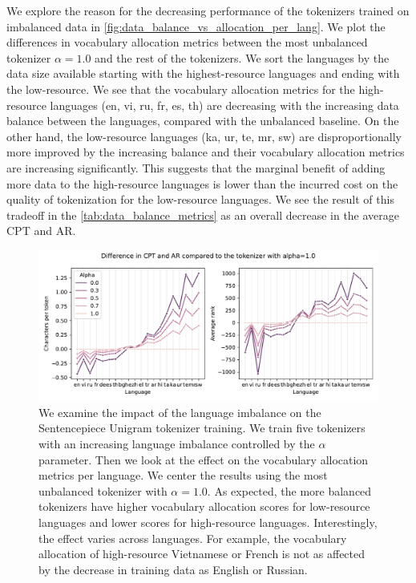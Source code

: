 We explore the reason for the decreasing performance of the tokenizers trained on imbalanced data in \autoref{fig:data_balance_vs_allocation_per_lang}. We plot the differences in vocabulary allocation metrics between the most unbalanced tokenizer $\alpha=1.0$ and the rest of the tokenizers. We sort the languages by the data size available starting with the highest-resource languages and ending with the low-resource. We see that the vocabulary allocation metrics for the high-resource languages (en, vi, ru, fr, es, th) are decreasing with the increasing data balance between the languages, compared with the unbalanced baseline. On the other hand, the low-resource languages (ka, ur, te, mr, sw) are disproportionally more improved by the increasing balance and their vocabulary allocation metrics are increasing significantly. This suggests that the marginal benefit of adding more data to the high-resource languages is lower than the incurred cost on the quality of tokenization for the low-resource languages. We see the result of this tradeoff in the \autoref{tab:data_balance_metrics} as an overall decrease in the average CPT and AR.

\begin{figure}[H]
    \centering
    \includegraphics[width=\textwidth]{figures/ar_cpt_vs_alpha.pdf}
    \caption{We examine the impact of the language imbalance on the Sentencepiece Unigram tokenizer training. We train five tokenizers with an increasing language imbalance controlled by the $\alpha$ parameter. Then we look at the effect on the vocabulary allocation metrics per language. We center the results using the most unbalanced tokenizer with $\alpha=1.0$. As expected, the more balanced tokenizers have higher vocabulary allocation scores for low-resource languages and lower scores for high-resource languages. Interestingly, the effect varies across languages. For example, the vocabulary allocation of high-resource Vietnamese or French is not as affected by the decrease in training data as English or Russian.}
    \label{fig:data_balance_vs_allocation_per_lang}
\end{figure}

